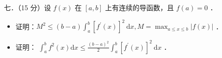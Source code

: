 \documentclass{article}
\begin{document}
七．（15 分）设 \(f(x)\) 在 \([a, b]\) 上有连续的导函数，且 \(f(a)=0\) ．

\begin{itemize}
  \item[（1）] 证明：\(M^{2} \leq(b-a) \int_{a}^{b}\left[f^{\prime}(x)\right]^{2} \mathrm{~d} x, M=\max _{a \leq x \leq b}|f(x)|\) ．
  \item[（2）] 证明： \(\int_{a}^{b} f^{2}(x) \mathrm{d} x \leq \frac{(b-a)^{2}}{2} \int_{a}^{b}\left[f^{\prime}(x)\right]^{2} \mathrm{~d} x\) ．
\end{itemize}
\end{document}
